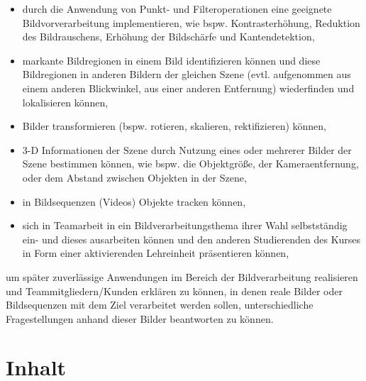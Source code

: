 \begin{itemize}
\tightlist
\item
  durch die Anwendung von Punkt- und Filteroperationen eine geeignete
  Bildvorverarbeitung implementieren, wie bspw. Kontrasterhöhung,
  Reduktion des Bildrauschens, Erhöhung der Bildschärfe und
  Kantendetektion,
\item
  markante Bildregionen in einem Bild identifizieren können und diese
  Bildregionen in anderen Bildern der gleichen Szene (evtl. aufgenommen
  aus einem anderen Blickwinkel, aus einer anderen Entfernung)
  wiederfinden und lokalisieren können,
\item
  Bilder transformieren (bspw. rotieren, skalieren, rektifizieren)
  können,
\item
  3-D Informationen der Szene durch Nutzung eines oder mehrerer Bilder
  der Szene bestimmen können, wie bspw. die Objektgröße, der
  Kameraentfernung, oder dem Abstand zwischen Objekten in der Szene,
\item
  in Bildsequenzen (Videos) Objekte tracken können,
\item
  sich in Teamarbeit in ein Bildverarbeitungsthema ihrer Wahl
  selbstständig ein- und dieses ausarbeiten können und den anderen
  Studierenden des Kurses in Form einer aktivierenden Lehreinheit
  präsentieren können,
\end{itemize}

um später zuverlässige Anwendungen im Bereich der Bildverarbeitung
realisieren und Teammitgliedern/Kunden erklären zu können, in denen
reale Bilder oder Bildsequenzen mit dem Ziel verarbeitet werden sollen,
unterschiedliche Fragestellungen anhand dieser Bilder beantworten zu
können.

\hypertarget{inhaltpathlabelmi-2017modulbeschreibungen-bachelorba_vc-bildverarbeitung-und-computer-vision}{%
\section*{Inhalt\label{/mi-2017/modulbeschreibungen-bachelor/BA_VC-bildverarbeitung-und-computer-vision}}\label{inhaltpathlabelmi-2017modulbeschreibungen-bachelorba_vc-bildverarbeitung-und-computer-vision}}

